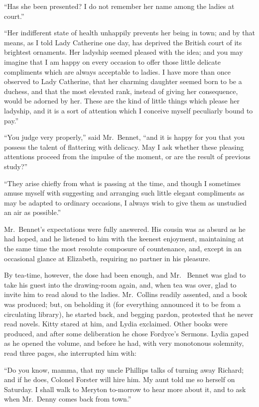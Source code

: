 ``Has she been presented?  I do not remember her name among
the ladies at court.''

``Her indifferent state of health unhappily prevents her being
in town; and by that means, as I told Lady Catherine one day,
has deprived the British court of its brightest ornaments.
Her ladyship seemed pleased with the idea; and you may imagine
that I am happy on every occasion to offer those little
delicate compliments which are always acceptable to ladies.
I have more than once observed to Lady Catherine, that her
charming daughter seemed born to be a duchess, and that the
most elevated rank, instead of giving her consequence, would
be adorned by her.  These are the kind of little things which
please her ladyship, and it is a sort of attention which I
conceive myself peculiarly bound to pay.''

``You judge very properly,'' said Mr.\ Bennet, ``and it is happy for
you that you possess the talent of flattering with delicacy.  May I
ask whether these pleasing attentions proceed from the impulse
of the moment, or are the result of previous study?''

``They arise chiefly from what is passing at the time, and though
I sometimes amuse myself with suggesting and arranging such
little elegant compliments as may be adapted to ordinary occasions,
I always wish to give them as unstudied an air as possible.''

Mr.\ Bennet's expectations were fully answered.  His cousin was
as absurd as he had hoped, and he listened to him with the
keenest enjoyment, maintaining at the same time the most
resolute composure of countenance, and, except in an occasional
glance at Elizabeth, requiring no partner in his pleasure.

By tea-time, however, the dose had been enough, and Mr.\ %
Bennet was glad to take his guest into the drawing-room again,
and, when tea was over, glad to invite him to read aloud to the
ladies.  Mr.\ Collins readily assented, and a book was produced;
but, on beholding it (for everything announced it to be from a
circulating library), he started back, and begging pardon,
protested that he never read novels.  Kitty stared at him, and
Lydia exclaimed.  Other books were produced, and after some
deliberation he chose Fordyce's Sermons.  Lydia gaped as he
opened the volume, and before he had, with very monotonous
solemnity, read three pages, she interrupted him with:

``Do you know, mamma, that my uncle Phillips talks of turning
away Richard; and if he does, Colonel Forster will hire him.  My
aunt told me so herself on Saturday.  I shall walk to Meryton
to-morrow to hear more about it, and to ask when Mr.\ Denny
comes back from town.''

